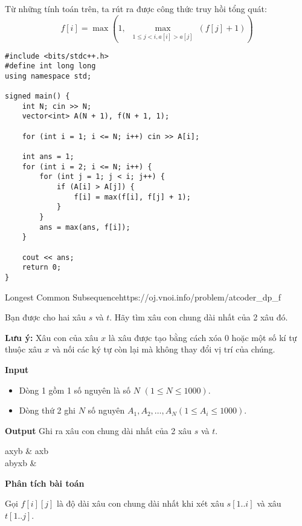 Từ những tính toán trên, ta rút ra được công thức truy hồi tổng quát:
\[
    f[i] = \max \left( 1,\ \max_{\substack{1 \leq j < i, a[i] > a[j]}} \left( f[j] + 1 \right) \right)
\]


\begin{lstlisting}[title=\centering \textbf{Cài đặt}]
#include <bits/stdc++.h>
#define int long long
using namespace std;

signed main() {
    int N; cin >> N;
    vector<int> A(N + 1), f(N + 1, 1);

    for (int i = 1; i <= N; i++) cin >> A[i];

    int ans = 1;
    for (int i = 2; i <= N; i++) {
        for (int j = 1; j < i; j++) {
            if (A[i] > A[j]) {
                f[i] = max(f[i], f[j] + 1);
            }
        }
        ans = max(ans, f[i]);
    }

    cout << ans;
    return 0;
}
\end{lstlisting}


\begin{baitap}{Longest Common Subsequence}{https://oj.vnoi.info/problem/atcoder\_dp\_f}

Bạn được cho hai xâu $s$ và $t$. Hãy tìm xâu con chung dài nhất của 2 xâu đó.

\textbf{Lưu ý: }Xâu con của xâu $x$ là xâu được tạo bằng cách xóa $0$ hoặc một số kí tự thuộc xâu $x$ và nối các ký tự còn lại mà không thay đổi vị trí của chúng.

\textbf{Input}
\begin{itemize}[noitemsep]
  \item Dòng 1 gồm 1 số nguyên là số $N$ $(1 \leq N \leq 1000)$.
  \item Dòng thứ 2 ghi $N$ số nguyên $A_1, A_2, \dots, A_N (1 \leq A_i \leq 1000)$.
\end{itemize}

\textbf{Output}
Ghi ra xâu con chung dài nhất của 2 xâu $s$ và $t$.

\end{baitap}

\begin{sampleio}
axyb & axb\\ 
abyxb &  \\ 
\end{sampleio}

\textbf{Phân tích bài toán}

Gọi \(f[i][j]\) là độ dài xâu con chung dài nhất khi xét xâu $s[1..i]$ và xâu $t[1..j]$.\\

